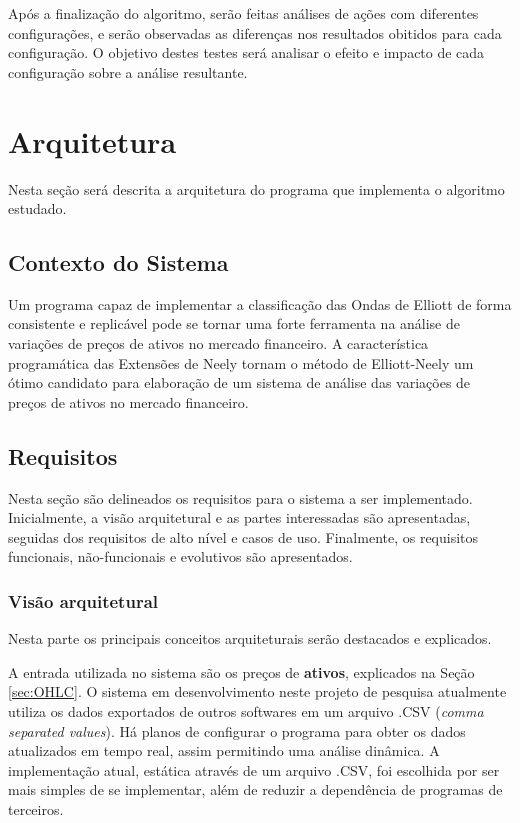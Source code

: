 \documentclass[12pt]{article}
\begin{document}
Após a finalização do algoritmo, serão feitas análises de ações com diferentes configurações,
e serão observadas as diferenças nos resultados obitidos para cada configuração.
O objetivo destes testes será analisar o efeito e impacto de cada configuração sobre a
análise resultante.

\newpage

\section{Arquitetura}

Nesta seção será descrita a arquitetura do programa que implementa o algoritmo estudado.

\subsection{Contexto do Sistema}

Um programa capaz de implementar a classificação das Ondas de Elliott de forma consistente
e replicável pode se tornar uma forte ferramenta na análise de variações de preços de ativos
no mercado financeiro. A característica programática das Extensões de Neely tornam o método
de Elliott-Neely um ótimo candidato para elaboração de um sistema de análise das
variações de preços de ativos no mercado financeiro.

\subsection{Requisitos}

Nesta seção são delineados os requisitos para o sistema a ser implementado.
Inicialmente, a visão arquitetural e as partes interessadas são apresentadas, seguidas dos
requisitos de alto nível e casos de uso. Finalmente, os requisitos funcionais,
não-funcionais e evolutivos são apresentados.

\subsubsection{Visão arquitetural}

Nesta parte os principais conceitos arquiteturais serão destacados e explicados.

A entrada utilizada no sistema são os preços de \textbf{ativos}, explicados na Seção
\ref{sec:OHLC}. O sistema em desenvolvimento neste projeto de pesquisa
atualmente utiliza os dados exportados de outros softwares
em um arquivo .CSV (\textit{comma separated values}).
Há planos de configurar o programa para obter os dados atualizados em tempo real, assim
permitindo uma análise dinâmica. A implementação atual, estática através de um arquivo
.CSV, foi escolhida por ser mais simples de se implementar, além de reduzir a dependência
de programas de terceiros.
\end{document}

